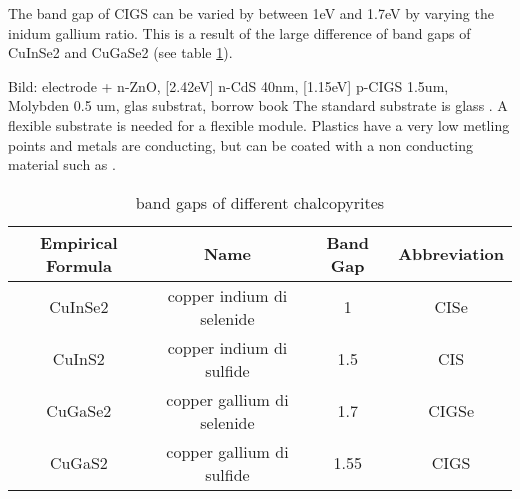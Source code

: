 The band gap of CIGS can be varied by between 1eV and 1.7eV by varying the inidum gallium ratio.
This is a result of the large difference of band gaps of CuInSe2 and CuGaSe2 (see table \ref{tab:cigs}). 

{Bild: electrode + n-ZnO, [2.42eV] n-CdS 40nm, [1.15eV] p-CIGS 1.5um, Molybden 0.5 um, glas substrat, borrow book} 
The standard substrate is glass . A flexible substrate is needed for a flexible module. 
Plastics have a very low metling points and metals are conducting, but can be coated with a non conducting material such as .
\begin{table}[htb]
    \center
    \begin{tabular}{cccc}
        \hline\hline
        Empirical Formula&    Name&   Band Gap&    Abbreviation\\
        \hline
        CuInSe2&       copper indium di selenide&  1&  CISe\\
        CuInS2&        copper indium di sulfide&  1.5&  CIS\\
        CuGaSe2&       copper gallium di selenide&  1.7&  CIGSe\\
        CuGaS2&        copper gallium di sulfide&  1.55&  CIGS\\
        \hline\hline
    \end{tabular}
	\caption{band gaps of different chalcopyrites}
	\label{tab:cigs}
\end{table}




